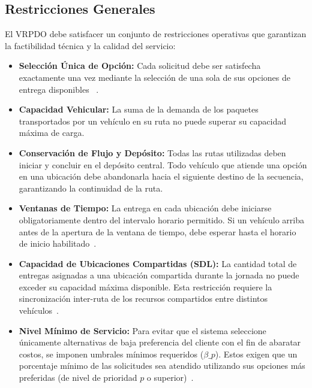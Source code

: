 \documentclass[letter, 10pt]{article}
\begin{document}
\subsection{Restricciones Generales} El VRPDO debe satisfacer un conjunto de restricciones operativas que garantizan la factibilidad técnica y la calidad del servicio: 
\begin{itemize} 
    \item \textbf{Selección Única de Opción:} Cada solicitud debe ser satisfecha exactamente una vez mediante la selección de una sola de sus opciones de entrega disponibles ~\cite{Dumez21Large, Tilk21LastMile}. 
    \item \textbf{Capacidad Vehicular:} La suma de la demanda de los paquetes transportados por un vehículo en su ruta no puede superar su capacidad máxima de carga. 
    \item \textbf{Conservación de Flujo y Depósito:} Todas las rutas utilizadas deben iniciar y concluir en el depósito central. Todo vehículo que atiende una opción en una ubicación debe abandonarla hacia el siguiente destino de la secuencia, garantizando la continuidad de la ruta. 
    \item \textbf{Ventanas de Tiempo:} La entrega en cada ubicación debe iniciarse obligatoriamente dentro del intervalo horario permitido. Si un vehículo arriba antes de la apertura de la ventana de tiempo, debe esperar hasta el horario de inicio habilitado~\cite{ Dumez21Large, Solomon87Algorithms}. 
    \item \textbf{Capacidad de Ubicaciones Compartidas (SDL):} La cantidad total de entregas asignadas a una ubicación compartida durante la jornada no puede exceder su capacidad máxima disponible. Esta restricción requiere la sincronización inter-ruta de los recursos compartidos entre distintos vehículos~\cite{Dumez21Large, Yang25Neighborhood}. 
    \item \textbf{Nivel Mínimo de Servicio:} Para evitar que el sistema seleccione únicamente alternativas de baja preferencia del cliente con el fin de abaratar costos, se imponen umbrales mínimos requeridos ($\beta\_p$). Estos exigen que un porcentaje mínimo de las solicitudes sea atendido utilizando sus opciones más preferidas (de nivel de prioridad $p$ o superior)~\cite{Dumez21Large, Tilk21LastMile, Yang25Neighborhood}. 
\end{itemize} 
\end{document}
